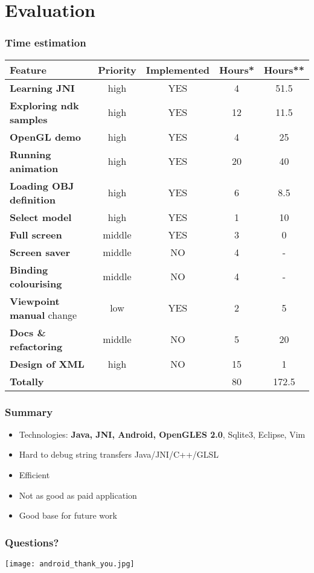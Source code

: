 \section{Evaluation} %
\begin{frame}\frametitle{Time estimation} 
\begin{tabular}{| l || c | c |  c | c |}
\hline
Feature & Priority & Implemented & Hours* & Hours**\\
\hline
\hline
\textbf{Learning JNI} & high & YES &                 4 & 51.5\\
\textbf{Exploring ndk samples} & high & YES &       12 & 11.5\\
\textbf{OpenGL demo} & high & YES &                  4 & 25\\
\textbf{Running animation} & high & YES &           20 & 40\\
\textbf{Loading OBJ definition} & high & YES &       6 &  8.5\\
\textbf{Select model} & high & YES &                 1 & 10\\
\textbf{Full screen} & middle & YES &                3 &  0\\
\textbf{Screen saver} & middle & NO &                4 &  -\\
\textbf{Binding colourising} & middle & NO &         4 & -\\
\textbf{Viewpoint manual} change & low & YES &       2 & 5\\
\textbf{Docs \& refactoring} & middle & NO &         5 & 20\\
\textbf{Design of XML} & high & NO &                15 & 1\\
\hline
\textbf{Totally} & & &                                80 & 172.5 \\
\hline
\end{tabular}
\end{frame}

\begin{frame}\frametitle{Summary} 
\begin{itemize}
    \item Technologies: {\bf Java, JNI, Android, OpenGLES 2.0}, Sqlite3, Eclipse, Vim
    \item Hard to debug string transfers Java/JNI/C++/GLSL
    \item Efficient
    \item Not as good as paid application
    \item Good base for future work
\end{itemize}
\end{frame}


\begin{frame}\frametitle{Questions?} 
\begin{center}
\texttt{[image: android\_thank\_you.jpg]}
\end{center}
\end{frame}
